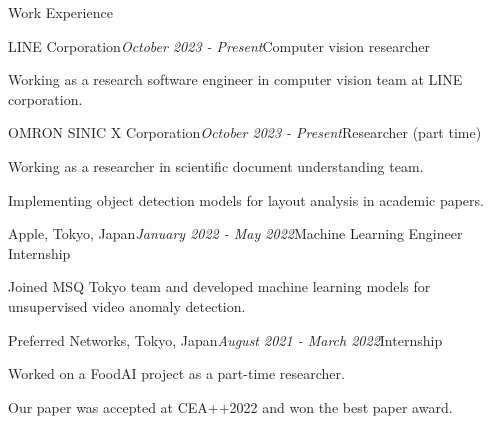 \begin{rSection}{Work Experience}

\begin{rSubsection}{LINE Corporation}{\em October 2023 - Present}{Computer vision researcher}{}
\item Working as a research software engineer in computer vision team at LINE corporation.
\end{rSubsection}

\begin{rSubsection}{OMRON SINIC X Corporation}{\em October 2023 - Present}{Researcher (part time)}{}
\item Working as a researcher in scientific document understanding team.
\item Implementing object detection models for layout analysis in academic papers.
\end{rSubsection}

\begin{rSubsection}{Apple, Tokyo, Japan}{\em January 2022 - May 2022}{Machine Learning Engineer Internship}{}
\item Joined MSQ Tokyo team and developed machine learning models for unsupervised video anomaly detection.
\end{rSubsection}

\begin{rSubsection}{Preferred Networks, Tokyo, Japan}{\em August 2021 - March 2022}{Internship}{}
\item Worked on a FoodAI project as a part-time researcher.
\item Our paper was accepted at CEA++2022 and won the best paper award.
\end{rSubsection}

\end{rSection}